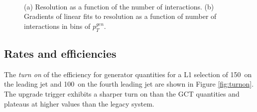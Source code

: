 \begin{figure}
    \begin{center} 
	~
	\caption{(a) Resolution as a function of the number of interactions. (b) Gradients of linear fits to 
	    resolution as a function of number of interactions in bins of $p^{gen}_{T}$.}
	    \label{fig:label:resolution}
    \end{center} 
\end{figure}

\subsection{Rates and efficiencies}

The \emph{turn on} of the efficiency for generator quantities for a L1 selection of 150\GeV~on the leading jet
and 100\GeV~on the fourth leading jet are shown in Figure \ref{fig:turnon}. The upgrade trigger exhibits a sharper turn on
than the GCT quantities and plateaus at higher values than the legacy system. 

